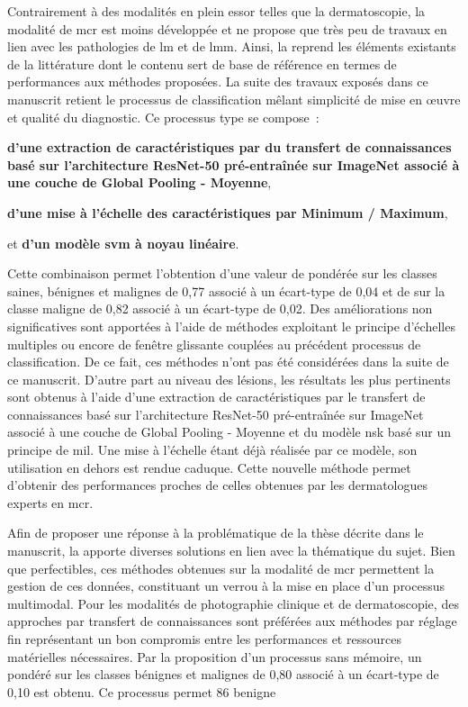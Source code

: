 Contrairement à des modalités en plein essor telles que la dermatoscopie, la modalité de \gls{mcr} est moins développée et ne propose que très peu de travaux en lien avec les pathologies de \gls{lm} et de \gls{lmm}. Ainsi, la  reprend les éléments existants de la littérature dont le contenu sert de base de référence en termes de performances aux méthodes proposées. La suite des travaux exposés dans ce manuscrit retient le processus de classification mêlant simplicité de mise en œuvre et qualité du diagnostic. Ce processus type se compose~:
\begin{inlinerate}
    \item \textbf{d'une extraction de caractéristiques par du transfert de connaissances basé sur l'architecture ResNet-50 pré-entraînée sur ImageNet associé à une couche de Global Pooling - Moyenne},
    \item \textbf{d'une mise à l'échelle des caractéristiques par Minimum / Maximum},
    \item et \textbf{d'un modèle \gls{svm} à noyau linéaire}.
\end{inlinerate} Cette combinaison permet l'obtention d'une valeur de \fscore{} pondérée sur les classes saines, bénignes et malignes de 0,77 associé à un écart-type de 0,04 et de \fscore{} sur la classe maligne de 0,82 associé à un écart-type de 0,02. Des améliorations non significatives sont apportées à l'aide de méthodes exploitant le principe d'échelles multiples ou encore de fenêtre glissante couplées au précédent processus de classification. De ce fait, ces méthodes n'ont pas été considérées dans la suite de ce manuscrit. D'autre part au niveau des lésions, les résultats les plus pertinents sont obtenus à l'aide d'une extraction de caractéristiques par le transfert de connaissances basé sur l'architecture ResNet-50 pré-entraînée sur ImageNet associé à une couche de Global Pooling - Moyenne et du modèle \gls{nsk} basé sur un principe de \gls{mil}. Une mise à l'échelle étant déjà réalisée par ce modèle, son utilisation en dehors est rendue caduque. Cette nouvelle méthode permet d'obtenir des performances proches de celles obtenues par les dermatologues experts en \gls{mcr}.\par

Afin de proposer une réponse à la problématique de la thèse décrite dans le manuscrit, la  apporte diverses solutions en lien avec la thématique du sujet. Bien que perfectibles, ces méthodes obtenues sur la modalité de \gls{mcr} permettent la gestion de ces données, constituant un verrou à la mise en place d'un processus multimodal. Pour les modalités de photographie clinique et de dermatoscopie, des approches par transfert de connaissances sont préférées aux méthodes par réglage fin représentant un bon compromis entre les performances et ressources matérielles nécessaires. Par la proposition d'un processus sans mémoire, un \fscore{} pondéré sur les classes bénignes et malignes de 0,80 associé à un écart-type de 0,10 est obtenu. Ce processus permet 86 benigne

